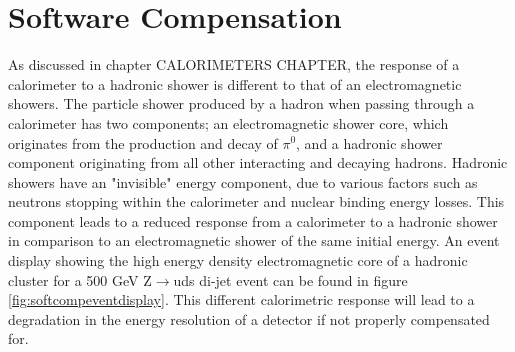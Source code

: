 
\section{Software Compensation}
\label{sec:softcomp}
As discussed in chapter CALORIMETERS CHAPTER, the response of a calorimeter to a hadronic shower is different to that of an electromagnetic showers.  The particle shower produced by a hadron when passing through a calorimeter has two components; an electromagnetic shower core, which originates from the production and decay of $\pi^{0}$, and a hadronic shower component originating from all other interacting and decaying hadrons.  Hadronic showers have an "invisible" energy component, due to various factors such as neutrons stopping within the calorimeter and nuclear binding energy losses.  This component leads to a reduced response from a calorimeter to a hadronic shower in comparison to an electromagnetic shower of the same initial energy.  An event display showing the high energy density electromagnetic core of a hadronic cluster for a 500 GeV Z$\rightarrow$uds di-jet event can be found in figure \ref{fig:softcompeventdisplay}.  This different calorimetric response will lead to a degradation in the energy resolution of a detector if not properly compensated for.  

